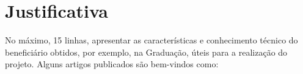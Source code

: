 \section{Justificativa}

No máximo, 15 linhas, apresentar as características e conhecimento técnico do beneficiário obtidos, por exemplo, na Graduação, úteis para a realização do projeto. Alguns artigos publicados são bem-vindos como: